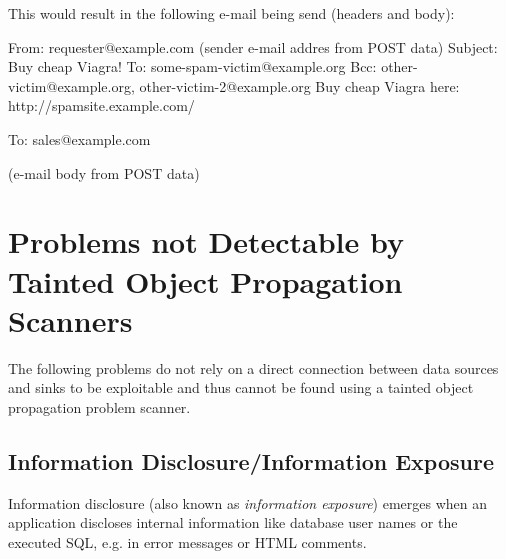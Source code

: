 This would result in the following e-mail being send (headers and body):

\begin{textcode}
From: requester@example.com (sender e-mail addres from POST data)
Subject: Buy cheap Viagra!
To: some-spam-victim@example.org
Bcc: other-victim@example.org, other-victim-2@example.org
Buy cheap Viagra here: http://spamsite.example.com/

To: sales@example.com

(e-mail body from POST data)
\end{textcode}



\section{Problems not Detectable by Tainted Object Propagation Scanners}
The following problems do not rely on a direct connection between data sources and sinks to be exploitable and thus cannot be found using a tainted object propagation problem scanner.



\subsection{Information Disclosure/Information Exposure}
\label{information-disclosure}
Information disclosure (also known as \emph{information exposure}) emerges when an application discloses internal information like database user names or the executed SQL, e.g. in error messages or HTML comments.

